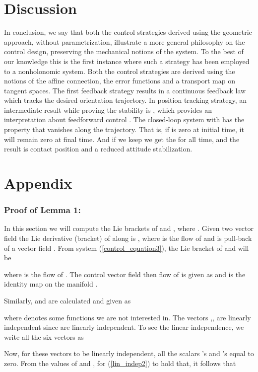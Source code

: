 \documentclass{ifacconf}
\begin{document}
\section{Discussion}
In conclusion, we say that both the control strategies derived using the geometric approach, without parametrization,  illustrate a more general philosophy on the control design, preserving the mechanical notions of the system. To the best of our knowledge this is the first instance where such a strategy has been employed to a nonholonomic system. Both the control  strategies are derived using the notions of the affine connection, the error functions and a transport map on tangent spaces. The first feedback strategy results in a continuous feedback law which tracks the desired orientation trajectory. In position tracking strategy, an intermediate result while proving the stability is , which provides an interpretation about feedforward control . The closed-loop system with  has the property that  vanishes along the trajectory. That is, if  is zero at initial time, it will remain zero at final time. And if we keep  we get the  for all time, and the result is contact position and a reduced attitude stabilization. 
\section*{Appendix}
\subsubsection{Proof of Lemma 1:} 
\label{A3}
In this section we will compute the Lie brackets of  and , where . Given two vector field  the Lie derivative (bracket) of  along  is , 
where  is the flow of  and  is pull-back of a vector field . From system (\ref{control_equation3}), the Lie bracket of  and  will be

where  is the flow of . The control vector field   
then flow of  is given as  
and  is the identity map on the manifold .

Similarly,  and  are calculated and given as

where  denotes some functions we are not interested in. The vectors ,, are linearly independent since  are linearly independent. To see the linear independence, we write all the six vectors as

Now, for these vectors to be linearly independent, all the scalars  's and 's equal to zero. From the values of  and  , for (\ref{lin_indep2}) to hold  that, it follows that
\end{document}
